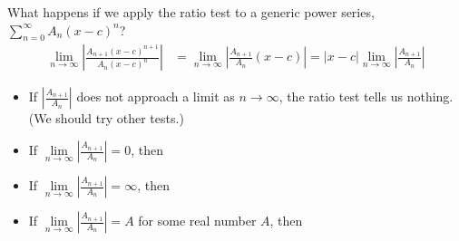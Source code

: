 \begin{frame}[t]
What happens if we apply the ratio test to a generic power series, $\sum\limits_{n=0}^\infty A_n(x-c)^n$?\pause
\begin{align*}
\lim_{n \to \infty}\left|\frac{A_{n+1}(x-c)^{n+1}}{A_n(x-c)^n}\right|&=
\lim_{n \to \infty}\left|\frac{A_{n+1}}{A_n}(x-c)\right|
=|x-c|\lim_{n \to \infty} \left| \frac{A_{n+1}}{A_n}\right|
\end{align*}
\begin{itemize}
\item If $\left| \frac{A_{n+1}}{A_n}\right|$ does not approach a limit as $n \to \infty$, the ratio test tells us nothing. (We should try other tests.)

\item If $\lim\limits_{n \to \infty} \left| \frac{A_{n+1}}{A_n}\right|=0$, then

\item  If $\lim\limits_{n \to \infty} \left| \frac{A_{n+1}}{A_n}\right|=\infty$, then 

\item If $\lim\limits_{n \to \infty} \left| \frac{A_{n+1}}{A_n}\right|=A$ for some real number $A$, then



\end{itemize}
\end{frame}
